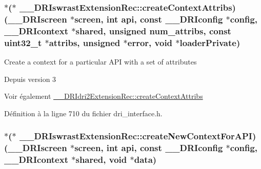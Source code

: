 \hypertarget{struct_____d_r_iswrast_extension_rec_a7c9ee2aa3822403e5944b0ae3222e621}{
\subsubsection[{create\-Context\-Attribs}]{$\ast$($\ast$ \-\_\-\-\_\-\-D\-R\-Iswrast\-Extension\-Rec\-::create\-Context\-Attribs)({\bf \-\_\-\-\_\-\-D\-R\-Iscreen} $\ast$screen, int api, const {\bf \-\_\-\-\_\-\-D\-R\-Iconfig} $\ast$config, {\bf \-\_\-\-\_\-\-D\-R\-Icontext} $\ast$shared, unsigned num\-\_\-attribs, const uint32\-\_\-t $\ast${\bf attribs}, unsigned $\ast$error, {\bf void} $\ast$loader\-Private)}}\label{struct_____d_r_iswrast_extension_rec_a7c9ee2aa3822403e5944b0ae3222e621}
Create a context for a particular A\-P\-I with a set of attributes

\begin{DoxySince}{Depuis}
version 3
\end{DoxySince}
\begin{DoxySeeAlso}{Voir également}
\hyperlink{struct_____d_r_idri2_extension_rec_a40cbd226d9bc5c4fcf380c751c449890}{\-\_\-\-\_\-\-D\-R\-Idri2\-Extension\-Rec\-::create\-Context\-Attribs} 
\end{DoxySeeAlso}


Définition à la ligne 710 du fichier dri\-\_\-interface.\-h.

\hypertarget{struct_____d_r_iswrast_extension_rec_a0379a865132590d3b9d83896c0cc7e00}{
\subsubsection[{create\-New\-Context\-For\-A\-P\-I}]{$\ast$($\ast$ \-\_\-\-\_\-\-D\-R\-Iswrast\-Extension\-Rec\-::create\-New\-Context\-For\-A\-P\-I)({\bf \-\_\-\-\_\-\-D\-R\-Iscreen} $\ast$screen, int api, const {\bf \-\_\-\-\_\-\-D\-R\-Iconfig} $\ast$config, {\bf \-\_\-\-\_\-\-D\-R\-Icontext} $\ast$shared, {\bf void} $\ast${\bf data})}}\label{struct_____d_r_iswrast_extension_rec_a0379a865132590d3b9d83896c0cc7e00}


